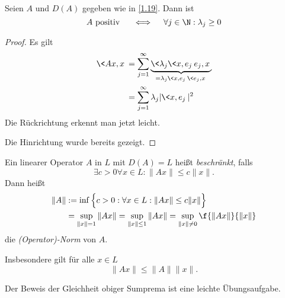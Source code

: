 \begin{nt} \label{1.22}
	Seien $A$ und $D(A)$ gegeben wie in \ref{1.19}.
	Dann ist
	\[
		A \text{ positiv }  \quad\iff\quad \forall j\in \N : \lambda_j \ge 0
	\]
	\begin{proof}
		Es gilt
		\begin{align*}
			\<Ax, x \> 
			&= \sum_{j=1}^\infty \underbrace{\<\lambda_j \<x,e_j\> e_j, x\>}_{= \lambda_j\<x,e_j\> \<e_j,x\>} \\
			&= \sum_{j=1}^\infty \lambda_j |\<x,e_j\>|^2
		\end{align*}
		Die Rückrichtung erkennt man jetzt leicht.

		Die Hinrichtung wurde bereits gezeigt.
	\end{proof}
\end{nt}

\begin{df} \label{1.23}
	Ein linearer Operator $A$ in $L$ mit $D(A) = L$ heißt \emph{beschränkt}, falls
	\[
		\exists c > 0 \forall x \in L : \|Ax\| \le c\|x\|.
	\]
	Dann heißt
	\begin{align*}
		\|A\| &:= \inf \Big\{ c > 0 : \forall x \in L : \|Ax\| \le c\|x\| \Big\} \\
		&= \sup_{\|x\|=1} \|Ax\| = \sup_{\|x\|\le 1} \|Ax\| = \sup_{\|x\|\neq 0} \f{\|Ax\|}{\|x\|}
	\end{align*}
	die \emph{(Operator)-Norm} von $A$.

	Insbesondere gilt für alle $ x\in L $
	\[
		\|Ax\| \le \|A\| \|x\|.
	\]
	\begin{note}
		Der Beweis der Gleichheit obiger Sumprema ist eine leichte Übungsaufgabe.
	\end{note}
\end{df}

